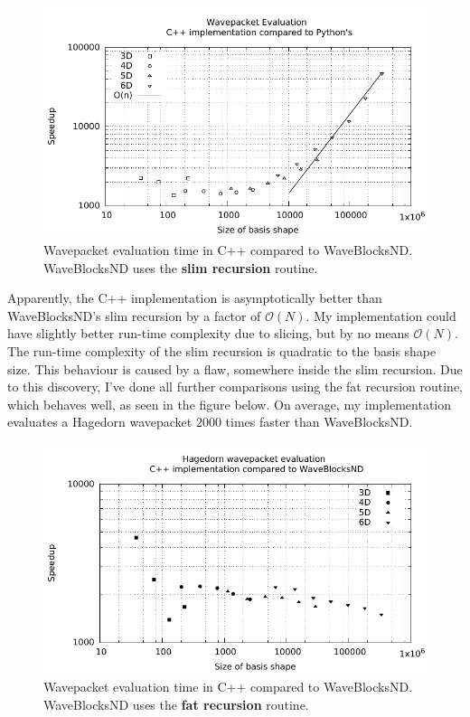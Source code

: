 \documentclass{article}
\begin{document}
\begin{figure}[H]
  \centering
  \includegraphics[width=1.0\textwidth]{plots/hawp_eval_cvp_slim}
  \caption{Wavepacket evaluation time in C++ compared to WaveBlocksND.
    WaveBlocksND uses the \textbf{slim recursion} routine.}
  \label{fig:hawp_eval_cvp_slim}
\end{figure}

Apparently, the C++ implementation is asymptotically better than
WaveBlocksND's slim recursion by a factor of \(\mathcal{O}(N)\).
My implementation could have slightly better run-time complexity due to slicing, but by
no means \(\mathcal{O}(N)\). The run-time complexity of the slim recursion is
quadratic to the basis shape size.
This behaviour is caused by a flaw, somewhere inside the slim recursion.
Due to this discovery, I've done all further comparisons using the fat recursion routine,
which behaves well, as seen in the figure below. On average, my implementation evaluates a
Hagedorn wavepacket 2000 times faster than WaveBlocksND.

\begin{figure}[H]
  \centering
  \includegraphics[width=1.0\textwidth]{plots/hawp_eval_cvp_fat}
  \caption{Wavepacket evaluation time in C++ compared to WaveBlocksND.
  WaveBlocksND uses the \textbf{fat recursion} routine.}
  \label{fig:hawp_eval_cvp_fat}
\end{figure}
\end{document}
